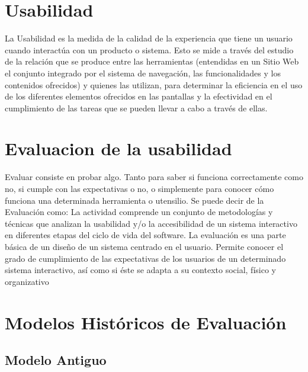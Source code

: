 \documentclass[11pt]{article}
\begin{document}
	\newpage
	\singlespacing
	\begin{normalsize}
		\begin{flushleft}
	\section{Usabilidad}
        \begin{itemize}
           
            La Usabilidad es la medida de la calidad de la experiencia que tiene un usuario cuando interactúa con un producto o sistema. Esto se mide a través del estudio de la relación que se produce entre las herramientas (entendidas en un Sitio Web el conjunto integrado por el sistema de navegación, las funcionalidades y los contenidos ofrecidos) y quienes las utilizan, para determinar la eficiencia en el uso de los diferentes elementos ofrecidos en las pantallas y la efectividad en el cumplimiento de las tareas que se pueden llevar a cabo a través de ellas.

        \end{itemize}
		
	\section{Evaluacion de la usabilidad}
	    \begin{itemize}
           
            Evaluar consiste en probar algo. Tanto para saber si funciona correctamente como no, si cumple con las expectativas o no, o simplemente para conocer cómo funciona una determinada herramienta o utensilio.
            Se puede decir de la Evaluación como: La actividad comprende un conjunto de metodologías y técnicas que analizan la usabilidad y/o la accesibilidad de un sistema interactivo en diferentes etapas del ciclo de vida del software.
            La evaluación es una parte básica de un diseño de un sistema centrado en el usuario. Permite conocer el grado de cumplimiento de las expectativas de los usuarios de un determinado sistema interactivo, así como si éste se adapta a su contexto social, físico y organizativo

        \end{itemize}
	
	
	\section{Modelos Históricos de Evaluación }
	\subsection{Modelo Antiguo }

\end{flushleft}
\end{normalsize}
\end{document}
